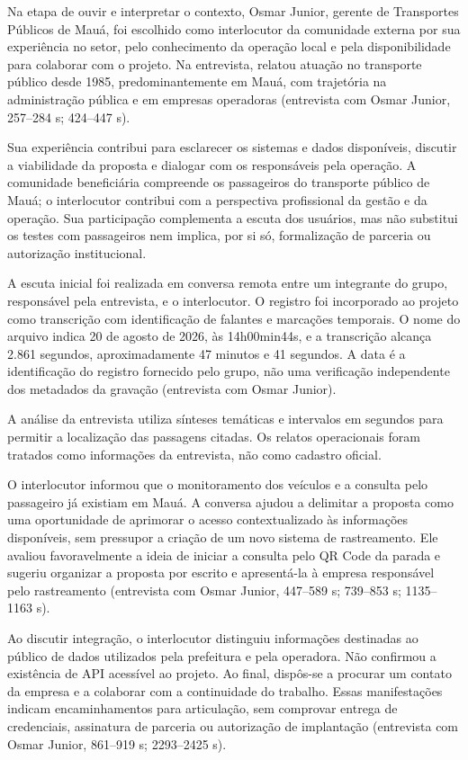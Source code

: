 

\label{sec:escuta-comunidade}
Na etapa de ouvir e interpretar o contexto, Osmar Junior, gerente de Transportes Públicos de Mauá, foi escolhido como interlocutor da comunidade externa por sua experiência no setor, pelo conhecimento da operação local e pela disponibilidade para colaborar com o projeto. Na entrevista, relatou atuação no transporte público desde 1985, predominantemente em Mauá, com trajetória na administração pública e em empresas operadoras  (entrevista com Osmar Junior, 257--284 s; 424--447 s).

Sua experiência contribui para esclarecer os sistemas e dados disponíveis, discutir a viabilidade da proposta e dialogar com os responsáveis pela operação. A comunidade beneficiária compreende os passageiros do transporte público de Mauá; o interlocutor contribui com a perspectiva profissional da gestão e da operação. Sua participação complementa a escuta dos usuários, mas não substitui os testes com passageiros nem implica, por si só, formalização de parceria ou autorização institucional.

A escuta inicial foi realizada em conversa remota entre um integrante do grupo, responsável pela entrevista, e o interlocutor. O registro foi incorporado ao projeto como transcrição com identificação de falantes e marcações temporais. O nome do arquivo indica 20 de agosto de 2026, às 14h00min44s, e a transcrição alcança 2.861 segundos, aproximadamente 47 minutos e 41 segundos. A data é a identificação do registro fornecido pelo grupo, não uma verificação independente dos metadados da gravação  (entrevista com Osmar Junior).

A análise da entrevista utiliza sínteses temáticas e intervalos em segundos para permitir a localização das passagens citadas. Os relatos operacionais foram tratados como informações da entrevista, não como cadastro oficial.

O interlocutor informou que o monitoramento dos veículos e a consulta pelo passageiro já existiam em Mauá. A conversa ajudou a delimitar a proposta como uma oportunidade de aprimorar o acesso contextualizado às informações disponíveis, sem pressupor a criação de um novo sistema de rastreamento. Ele avaliou favoravelmente a ideia de iniciar a consulta pelo QR Code da parada e sugeriu organizar a proposta por escrito e apresentá-la à empresa responsável pelo rastreamento  (entrevista com Osmar Junior, 447--589 s; 739--853 s; 1135--1163 s).

Ao discutir integração, o interlocutor distinguiu informações destinadas ao público de dados utilizados pela prefeitura e pela operadora. Não confirmou a existência de API acessível ao projeto. Ao final, dispôs-se a procurar um contato da empresa e a colaborar com a continuidade do trabalho. Essas manifestações indicam encaminhamentos para articulação, sem comprovar entrega de credenciais, assinatura de parceria ou autorização de implantação  (entrevista com Osmar Junior, 861--919 s; 2293--2425 s).

